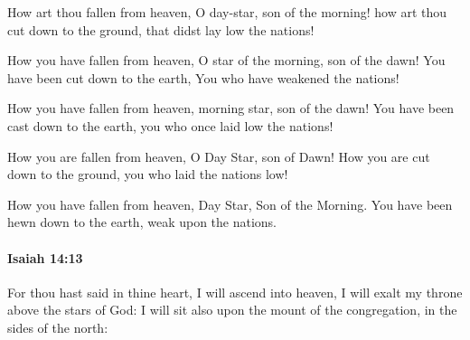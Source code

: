 \begin{framed}
\begin{compactdesc}
\begin{compactenum}
						\end{compactenum}
					\item[ASV] How art thou fallen from heaven, O day-star, son of the morning! how art thou cut down to the ground, that didst lay low the nations!
					\item[NASB] How you have fallen from heaven, O star of the morning, son of the dawn! You have been cut down to the earth, You who have weakened the nations!
					\item[NIV] How you have fallen from heaven, morning star, son of the dawn! You have been cast down to the earth, you who once laid low the nations!
					\item[NRSV] How you are fallen from heaven, O Day Star, son of Dawn! How you are cut down to the ground, you who laid the nations low!
					\item[NICOT 319] How you have fallen from heaven,
										Day Star, Son of the Morning.
									You have been hewn down to the earth,
										weak upon the nations.
				\end{compactdesc}
			\end{framed}

		\paragraph{Isaiah 14:13} %
			\label{ISAIAH-14-13}

			For thou hast said in thine heart, I will ascend into heaven, I will exalt my throne above the stars of God: I will sit also upon the mount of the congregation, in the sides of the north:

